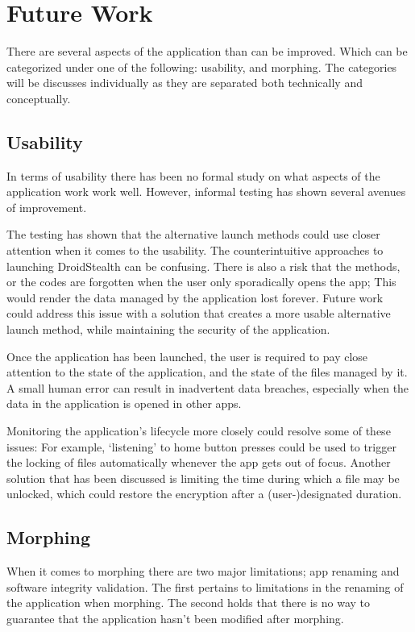 \section{Future Work}
\label{sec:future-work}

There are several aspects of the application than can be improved. Which
can be categorized under one of the following: usability, and morphing.
The categories will be discusses individually as they are separated both
technically and conceptually. 

\subsection{Usability}
In terms of usability there has been no formal study on what aspects of the application work work well. 
However, informal testing has shown several avenues of improvement. 

The testing has shown that the alternative launch methods could use closer attention when it comes to the usability.
The counterintuitive approaches to launching DroidStealth can be confusing.
There is also a risk that the methods, or the codes are forgotten when the user only sporadically opens the app;
This would render the data managed by the application lost forever.
Future work could address this issue with a solution that creates a more usable alternative launch method, while maintaining the security of the application.

Once the application has been launched, the user is required to pay close attention to the state of the application, and the state of the files managed by it.
A small human error can result in inadvertent data breaches, especially when the data in the application is opened in other apps.

Monitoring the application's lifecycle more closely could resolve some of these issues:
For example, `listening' to home button presses could be used to trigger the locking of files automatically whenever the app gets out of focus.
Another solution that has been discussed is limiting the time during which a file may be unlocked, which could restore the encryption after a (user-)designated duration.

\subsection{Morphing} 
\label{sec:limitations:morphing}

When it comes to morphing there are two major limitations; app renaming and software integrity validation. 
The first pertains to limitations in the renaming of the application when morphing. 
The second holds that there is no way to guarantee that the application hasn't been modified after morphing.

